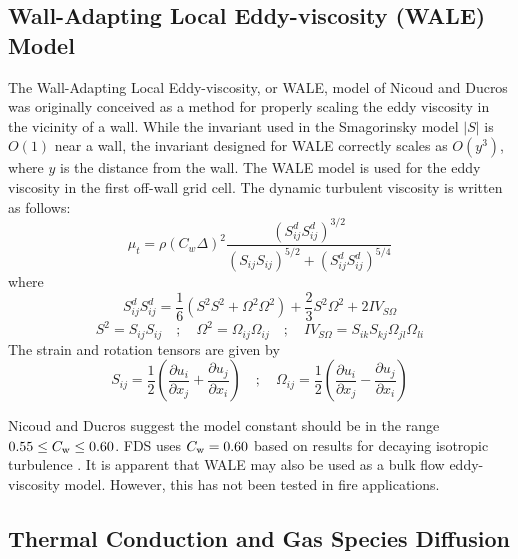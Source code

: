 \subsection{Wall-Adapting Local Eddy-viscosity (WALE) Model}
\label{sec:wale}

The Wall-Adapting Local Eddy-viscosity, or WALE, model of Nicoud and Ducros \cite{Nicoud:1999} was originally conceived as a method for properly scaling the eddy viscosity in the vicinity of a wall.  While the invariant used in the Smagorinsky model $|S|$ is $O(1)$ near a wall, the invariant designed for WALE correctly scales as $O(y^3)$, where $y$ is the distance from the wall.  The WALE model is used for the eddy viscosity in the first off-wall grid cell.  The dynamic turbulent viscosity is written as follows:
\begin{equation}
\label{eq:wale}
\mu_{\si{t}} = \rho (C_{\si{w}} \Delta)^2 \frac{(S^d_{ij} S^d_{ij})^{3/2}}{(S_{ij} S_{ij})^{5/2} + (S^d_{ij} S^d_{ij})^{5/4}}
\end{equation}
where
\begin{equation}
S^d_{ij} S^d_{ij} = \frac{1}{6} \left(S^2 S^2 + \Omega^2 \Omega^2\right) + \frac{2}{3} S^2 \Omega^2 + 2 {IV}_{S\Omega}
\end{equation}
\begin{equation*}
S^2 = S_{ij} S_{ij} \quad ; \quad \Omega^2 = \Omega_{ij} \Omega_{ij} \quad ; \quad {IV}_{S\Omega} = S_{ik}S_{kj}\Omega_{jl}\Omega_{li}
\end{equation*}
The strain and rotation tensors are given by
\begin{equation}
S_{ij} = \frac{1}{2} \left( \frac{\partial u_i}{\partial x_j} + \frac{\partial u_j}{\partial x_i} \right) \quad ; \quad \Omega_{ij} = \frac{1}{2} \left( \frac{\partial u_i}{\partial x_j} - \frac{\partial u_j}{\partial x_i} \right)
\end{equation}

Nicoud and Ducros \cite{Nicoud:1999} suggest the model constant should be in the range $0.55 \le C_{\rm w} \le 0.60$.  FDS uses $C_{\rm w} = 0.60$ based on results for decaying isotropic turbulence \cite{FDS_Verification_Guide}.  It is apparent that WALE may also be used as a bulk flow eddy-viscosity model.  However, this has not been tested in fire applications.

\subsection{Thermal Conduction and Gas Species Diffusion}


